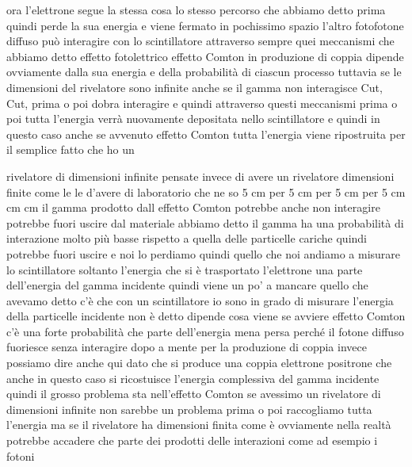 ora l'elettrone segue la stessa cosa lo stesso percorso che abbiamo detto prima quindi perde la sua energia e viene fermato in pochissimo spazio l'altro fotofotone diffuso può interagire con lo scintillatore attraverso sempre quei meccanismi che abbiamo detto effetto fotolettrico effetto Comton in produzione di coppia dipende ovviamente dalla sua energia e della probabilità di ciascun processo tuttavia se le dimensioni del rivelatore sono infinite anche se il gamma non interagisce Cut, Cut, prima o poi dobra interagire e quindi attraverso questi meccanismi prima o poi tutta l'energia verrà nuovamente depositata nello scintillatore e quindi in questo caso anche se avvenuto effetto Comton tutta l'energia viene ripostruita per il semplice fatto che ho un 

rivelatore di dimensioni infinite pensate invece di avere un rivelatore dimensioni finite come le le d'avere di laboratorio che ne so 5 cm per 5 cm per 5 cm per 5 cm cm cm il gamma prodotto dall effetto Comton potrebbe anche non interagire potrebbe fuori uscire dal materiale abbiamo detto il gamma ha una probabilità di interazione molto più basse rispetto a quella delle particelle cariche quindi potrebbe fuori uscire e noi lo perdiamo quindi quello che noi andiamo a misurare lo scintillatore soltanto l'energia che si è trasportato l'elettrone una parte dell'energia del gamma incidente quindi viene un po' a mancare quello che avevamo detto c'è che con un scintillatore io sono in grado di misurare l'energia della particelle incidente non è detto dipende cosa viene se avviere effetto Comton c'è una forte probabilità che parte dell'energia mena persa perché il fotone diffuso fuoriesce senza interagire dopo a mente per la produzione di coppia invece possiamo dire anche qui dato che si produce una coppia elettrone positrone che anche in questo caso si ricostuisce l'energia complessiva del gamma incidente quindi il grosso problema sta nell'effetto Comton se avessimo un rivelatore di dimensioni infinite non sarebbe un problema prima o poi raccogliamo tutta l'energia ma se il rivelatore ha dimensioni finita come è ovviamente nella realtà potrebbe accadere che parte dei prodotti delle interazioni come ad esempio i fotoni 


